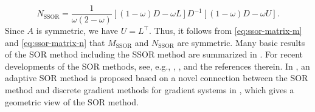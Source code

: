 \begin{equation}\label{eq:ssor-matrix-n}
N_{\mathrm{SSOR}}=\frac1{\omega(2-\omega)}[(1-\omega)D-\omega L]D^{-1}[(1-\omega)D-\omega U].
\end{equation}
{Since $A$ is symmetric, we have $U=L^\top$. Thus, it follows from \eqref{eq:ssor-matrix-m} and \eqref{eq:ssor-matrix-n} that $M_{\mathrm{SSOR}}$ and $N_{\mathrm{SSOR}}$ are symmetric.}
{Many basic results of the SOR method including the SSOR method are summarized in . For recent developments of the SOR methods, see, e.g., , ,  and the references therein. In , an adaptive SOR method is proposed based on a novel connection between the SOR method and discrete gradient methods for gradient systems in , which gives a geometric view of the SOR method.}
